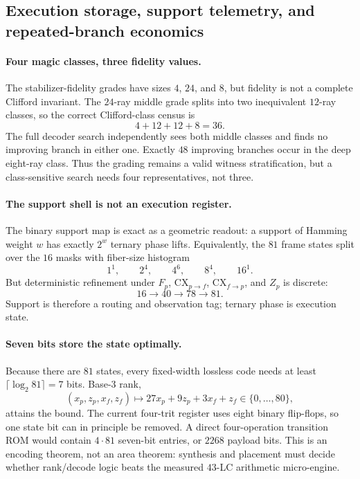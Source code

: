 \subsection{Execution storage, support telemetry, and repeated-branch economics}
\label{sec:bt2838-bt2840-blueprint-extension}

\paragraph{Four magic classes, three fidelity values.}
The stabilizer-fidelity grades have sizes $4$, $24$, and $8$, but fidelity is not a
complete Clifford invariant.  The $24$-ray middle grade splits into two inequivalent
$12$-ray classes, so the correct Clifford-class census is
\[
  \boxed{4+12+12+8=36}.
\]
The full decoder search independently sees both middle classes and finds no improving
branch in either one.  Exactly $48$ improving branches occur in the deep eight-ray
class.  Thus the grading remains a valid witness stratification, but a class-sensitive
search needs four representatives, not three.

\paragraph{The support shell is not an execution register.}
The binary support map is exact as a geometric readout: a support of Hamming weight $w$
has exactly $2^w$ ternary phase lifts.  Equivalently, the $81$ frame states split over the
$16$ masks with fiber-size histogram
\[
  1^1,\qquad 2^4,\qquad 4^6,\qquad 8^4,\qquad 16^1.
\]
But deterministic refinement under
$F_p$, $\mathrm{CX}_{p\to f}$, $\mathrm{CX}_{f\to p}$, and $Z_p$ is discrete:
\[
  \boxed{16\longrightarrow40\longrightarrow78\longrightarrow81}.
\]
Support is therefore a routing and observation tag; ternary phase is execution state.

\paragraph{Seven bits store the state optimally.}
Because there are $81$ states, every fixed-width lossless code needs at least
$\lceil\log_2 81\rceil=7$ bits.  Base-$3$ rank,
\[
  (x_p,z_p,x_f,z_f)\longmapsto 27x_p+9z_p+3x_f+z_f\in\{0,\ldots,80\},
\]
attains the bound.  The current four-trit register uses eight binary flip-flops, so one
state bit can in principle be removed.  A direct four-operation transition ROM would
contain $4\cdot81$ seven-bit entries, or $2268$ payload bits.  This is an encoding theorem,
not an area theorem: synthesis and placement must decide whether rank/decode logic beats
the measured $43$-LC arithmetic micro-engine.

